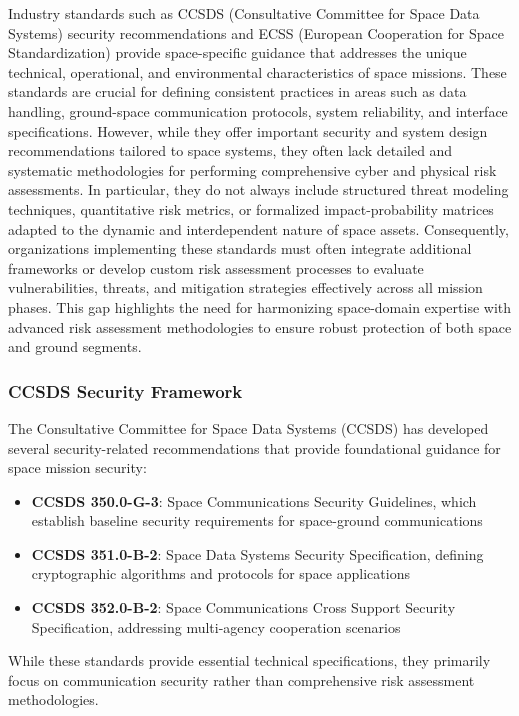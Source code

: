 \documentclass[binding=0.6cm]{sapthesis}
\begin{document}
Industry standards such as CCSDS (Consultative Committee for Space Data Systems) security recommendations and ECSS (European Cooperation for Space Standardization) provide space-specific guidance that addresses the unique technical, operational, and environmental characteristics of space missions. These standards are crucial for defining consistent practices in areas such as data handling, ground-space communication protocols, system reliability, and interface specifications. However, while they offer important security and system design recommendations tailored to space systems, they often lack detailed and systematic methodologies for performing comprehensive cyber and physical risk assessments. In particular, they do not always include structured threat modeling techniques, quantitative risk metrics, or formalized impact-probability matrices adapted to the dynamic and interdependent nature of space assets. Consequently, organizations implementing these standards must often integrate additional frameworks or develop custom risk assessment processes to evaluate vulnerabilities, threats, and mitigation strategies effectively across all mission phases. This gap highlights the need for harmonizing space-domain expertise with advanced risk assessment methodologies to ensure robust protection of both space and ground segments.

\subsubsection{CCSDS Security Framework}

The Consultative Committee for Space Data Systems (CCSDS) has developed several security-related recommendations that provide foundational guidance for space mission security:

\begin{itemize}
    \item \textbf{CCSDS 350.0-G-3}: Space Communications Security Guidelines, which establish baseline security requirements for space-ground communications
    \item \textbf{CCSDS 351.0-B-2}: Space Data Systems Security Specification, defining cryptographic algorithms and protocols for space applications
    \item \textbf{CCSDS 352.0-B-2}: Space Communications Cross Support Security Specification, addressing multi-agency cooperation scenarios
\end{itemize}

While these standards provide essential technical specifications, they primarily focus on communication security rather than comprehensive risk assessment methodologies.
\end{document}
